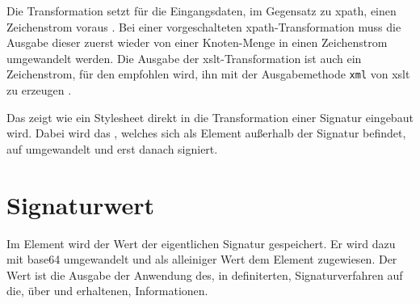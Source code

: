 Die Transformation setzt für die Eingangsdaten, im Gegensatz zu \gls{xpath}, einen Zeichenstrom voraus \cite{xml-dsig:w3c}. Bei einer vorgeschalteten
\gls{xpath}-Transformation muss die Ausgabe dieser zuerst wieder von einer Knoten-Menge in einen Zeichenstrom umgewandelt werden. Die Ausgabe der
\gls{xslt}-Transformation ist auch ein Zeichenstrom, für den empfohlen wird, ihn mit der Ausgabemethode \texttt{xml} von \gls{xslt} zu erzeugen \cite{xml-dsig:w3c}.

Das  zeigt wie ein Stylesheet direkt in die Transformation einer Signatur eingebaut wird. Dabei wird das 
, welches sich als Element außerhalb der Signatur befindet, auf  umgewandelt und erst danach signiert.



\section{Signaturwert}
Im Element  wird der Wert der eigentlichen Signatur gespeichert. Er wird dazu mit \gls{base64} umgewandelt und als alleiniger Wert dem
Element zugewiesen. Der Wert ist die Ausgabe der Anwendung des, in  definiterten, Signaturverfahren auf die, über  und
 erhaltenen, Informationen.
